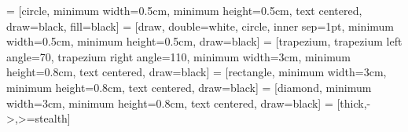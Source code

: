 \usepackage[slovak]{babel}
\usepackage[utf8]{inputenc}
\usepackage{times}
\usepackage{url}
\usepackage[textwidth=15.2cm,textheight=23cm]{geometry}
\usepackage{xcolor}
\usepackage{algorithm}
\usepackage{algpseudocode}
\usepackage{amsfonts}
\usepackage{amsmath}
\usepackage{calc}
\usepackage{enumitem}

\usepackage{tikz}
\usetikzlibrary{shapes.geometric, arrows}
 = [circle, minimum width=0.5cm, minimum height=0.5cm, text centered, draw=black, fill=black]
 = [draw, double=white, circle, inner sep=1pt, minimum width=0.5cm, minimum height=0.5cm, draw=black]
 = [trapezium, trapezium left angle=70, trapezium right angle=110, minimum width=3cm, minimum height=0.8cm, text centered, draw=black]
 = [rectangle, minimum width=3cm, minimum height=0.8cm, text centered, draw=black]
 = [diamond, minimum width=3cm, minimum height=0.8cm, text centered, draw=black]
 = [thick,->,>=stealth]

\usepackage{pgfplots}

\newcommand{\V}[1]{\mathit{#1}}
\newcommand{\K}[1]{\mathrm{#1}}
\DeclareMathOperator{\argmax}{arg\,max}

\usepackage{graphicx}


\usepackage[bf]{caption}

\usepackage[hyperindex,
  plainpages=false,
  pdftex,
  colorlinks,
  pdfborder={0 0 0},
  pdfpagelabels]{hyperref}


\newcommand{\myincludegraphics}[4]{
  \begin{figure}[!h]
  \centering
  \texttt{[image: \#2]}
  \caption{#3.} \label{#4}
  \end{figure}
}

\newcommand{\titlepageandcontents}{
  

  \pagestyle{plain}
  \pagenumbering{roman}
  \setcounter{page}{1}

  \newpage
  \pagestyle{plain}
  \pagenumbering{arabic}
  \setcounter{page}{1}
}

\def\uv#1{\iflanguage{english}{``#1''}%
                              {\quotedblbase #1\textquotedblleft}}%

